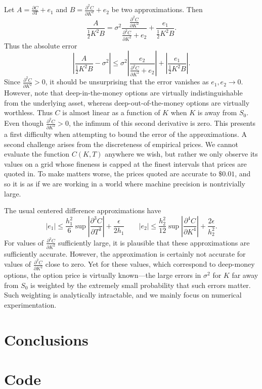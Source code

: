 \documentclass[12pt]{article}
\numberwithin{equation}{section}
\newcommand{\diff}[2]{\frac{\partial #1}{\partial #2}}
\newcommand{\abs}[1]{\left|#1\right|}
\begin{document}
Let $A = \diff{C}{T} + e_1$ and $B = \diff{^2C}{K^2} + e_2$ be two approximations. Then \[
\frac{A}{\frac{1}{2}K^2 B} = \sigma^2 \frac{\diff{^2C}{K^2}}{\diff{^2C}{K^2} + e_2} + \frac{e_1}{\frac{1}{2}K^2 B}.
\]
Thus the absolute error \[
\abs{\frac{A}{\frac{1}{2}K^2 B} - \sigma^2} \le \sigma^2 \abs{\frac{e_2}{\diff{^2C}{K^2}+e_2}} + \abs{\frac{e_1}{\frac{1}{2}K^2B}}.
\]
Since $\diff{^2C}{K^2} > 0$, it should be unsurprising that the error vanishes as $e_1,e_2 \to 0$. However, note that deep-in-the-money options are virtually indistinguishable from the underlying asset, whereas deep-out-of-the-money options are virtually worthless. Thus $C$ is almost linear as a function of $K$ when $K$ is away from $S_0$.
Even though $\diff{^2C}{K^2} > 0$, the infimum of this second derivative is zero. This presents a first difficulty when attempting to bound the error of the approximations. A second challenge arises from the discreteness of empirical prices. We cannot evaluate the function $C(K,T)$ anywhere we wish, but rather we only observe its values on a grid whose fineness is capped at the finest intervals that prices are quoted in. To make matters worse, the prices quoted are accurate to $\$0.01$, and so it is as if we are working in a world where machine precision is nontrivially large.


The usual centered difference approximations have \[
|e_1|\le \frac{h_1^2}{6}\sup \abs{\diff{^3C}{T^3}} + \frac{\epsilon}{2h_1} \qquad |e_2| \le \frac{h_2^2}{12}\sup \abs{\diff{^4C}{K^4}} + \frac{2\epsilon}{h_2^2}.
\]
For values of $\diff{^2C}{K^2}$ sufficiently large, it is plausible that these approximations are sufficiently accurate. However, the approximation is certainly not accurate for values of $\diff{^2C}{K^2}$ close to zero. Yet for these values, which correspond to deep-money options, the option price is virtually known---the large errors in $\sigma^2$ for $K$ far away from $S_0$ is weighted by the extremely small probability that such errors matter. Such weighting is analytically intractable, and we mainly focus on numerical experimentation. 


\section{Conclusions}




\newpage

\appendix
\appendixpage

\section{Code}






\end{document}
